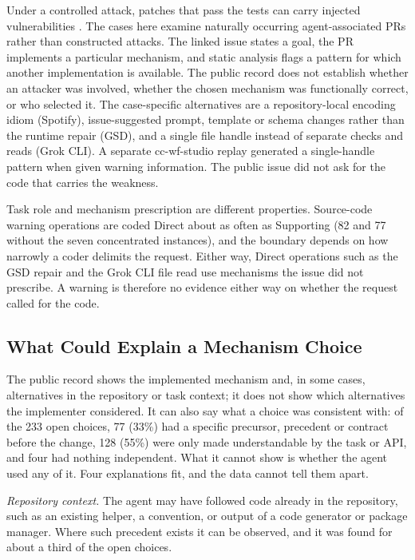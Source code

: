 \documentclass[acmsmall,screen,nonacm]{acmart}
\begin{document}
Under a controlled attack, patches that pass the tests can carry injected vulnerabilities \cite{b3}. The cases here examine naturally occurring agent-associated PRs rather than constructed attacks. The linked issue states a goal, the PR implements a particular mechanism, and static analysis flags a pattern for which another implementation is available. The public record does not establish whether an attacker was involved, whether the chosen mechanism was functionally correct, or who selected it. The case-specific alternatives are a repository-local encoding idiom (Spotify), issue-suggested prompt, template or schema changes rather than the runtime repair (GSD), and a single file handle instead of separate checks and reads (Grok CLI). A separate cc-wf-studio replay generated a single-handle pattern when given warning information. The public issue did not ask for the code that carries the weakness.

Task role and mechanism prescription are different properties. Source-code warning operations are coded Direct about as often as Supporting (82 and 77 without the seven concentrated instances), and the boundary depends on how narrowly a coder delimits the request. Either way, Direct operations such as the GSD repair and the Grok CLI file read use mechanisms the issue did not prescribe. A warning is therefore no evidence either way on whether the request called for the code.

\subsection{What Could Explain a Mechanism Choice}\label{sec:explain}

The public record shows the implemented mechanism and, in some cases, alternatives in the repository or task context; it does not show which alternatives the implementer considered. It can also say what a choice was consistent with: of the 233 open choices, 77 (33\%) had a specific precursor, precedent or contract before the change, 128 (55\%) were only made understandable by the task or API, and four had nothing independent. What it cannot show is whether the agent used any of it. Four explanations fit, and the data cannot tell them apart.

\emph{Repository context.} The agent may have followed code already in the repository, such as an existing helper, a convention, or output of a code generator or package manager. Where such precedent exists it can be observed, and it was found for about a third of the open choices.
\end{document}

